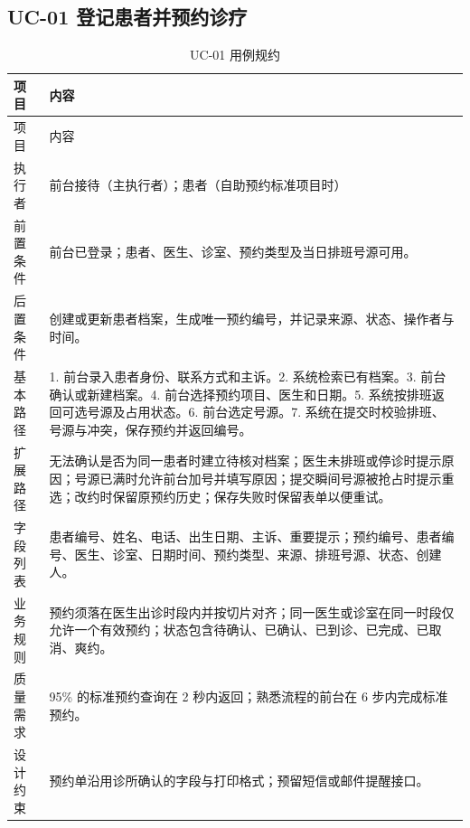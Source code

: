 \documentclass[UTF8,a4paper,12pt,fontset=fandol]{ctexart}
\begin{document}
\subsection{UC-01 登记患者并预约诊疗}
\begin{longtable}{L{3.1cm}Z}
\caption{UC-01 用例规约}\label{tab:uc01}\\
\toprule 项目 & 内容 \\ \midrule
\endfirsthead
\toprule 项目 & 内容 \\ \midrule
\endhead
执行者 & 前台接待（主执行者）；患者（自助预约标准项目时） \\
前置条件 & 前台已登录；患者、医生、诊室、预约类型及当日排班号源可用。 \\
后置条件 & 创建或更新患者档案，生成唯一预约编号，并记录来源、状态、操作者与时间。 \\
基本路径 & 1. 前台录入患者身份、联系方式和主诉。2. 系统检索已有档案。3. 前台确认或新建档案。4. 前台选择预约项目、医生和日期。5. 系统按排班返回可选号源及占用状态。6. 前台选定号源。7. 系统在提交时校验排班、号源与冲突，保存预约并返回编号。 \\
扩展路径 & 无法确认是否为同一患者时建立待核对档案；医生未排班或停诊时提示原因；号源已满时允许前台加号并填写原因；提交瞬间号源被抢占时提示重选；改约时保留原预约历史；保存失败时保留表单以便重试。 \\
字段列表 & 患者编号、姓名、电话、出生日期、主诉、重要提示；预约编号、患者编号、医生、诊室、日期时间、预约类型、来源、排班号源、状态、创建人。 \\
业务规则 & 预约须落在医生出诊时段内并按切片对齐；同一医生或诊室在同一时段仅允许一个有效预约；状态包含待确认、已确认、已到诊、已完成、已取消、爽约。 \\
质量需求 & 95\% 的标准预约查询在 2 秒内返回；熟悉流程的前台在 6 步内完成标准预约。 \\
设计约束 & 预约单沿用诊所确认的字段与打印格式；预留短信或邮件提醒接口。 \\
\bottomrule
\end{longtable}

\end{document}
